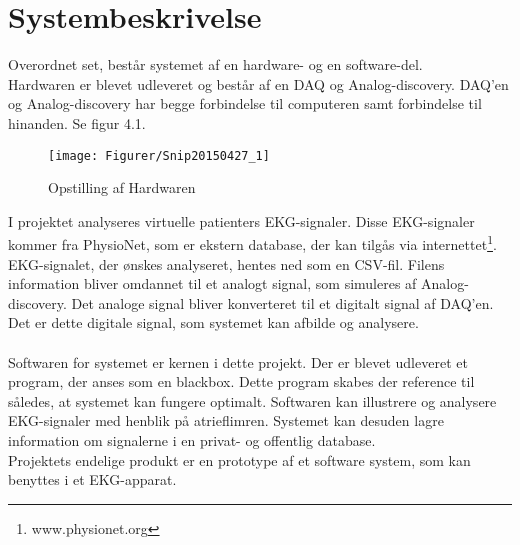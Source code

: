\chapter{Systembeskrivelse}

Overordnet set, består systemet af en hardware- og en software-del.\\ Hardwaren er blevet udleveret og består af en DAQ og Analog-discovery. DAQ'en og Analog-discovery har begge forbindelse til computeren samt forbindelse til hinanden. Se figur 4.1.  

\begin{figure}[H]
	\centering
	\texttt{[image: Figurer/Snip20150427\_1]}
	\caption{Opstilling af Hardwaren}
\end{figure}

I projektet analyseres virtuelle patienters EKG-signaler. Disse EKG-signaler kommer fra PhysioNet, som er ekstern database, der kan tilgås via internettet\footnote{www.physionet.org}. EKG-signalet, der ønskes analyseret, hentes ned som en CSV-fil. Filens information bliver omdannet til et analogt signal, som simuleres af Analog-discovery. Det analoge signal bliver konverteret til et digitalt signal af DAQ'en. Det er dette digitale signal, som systemet kan afbilde og analysere.
\\ \\
Softwaren for systemet er kernen i dette projekt. Der er blevet udleveret et program, der anses som en blackbox. Dette program skabes der reference til således, at systemet kan fungere optimalt. Softwaren kan illustrere og analysere EKG-signaler med henblik på atrieflimren. Systemet kan desuden lagre information om signalerne i en privat- og offentlig database.\\
Projektets endelige produkt er en prototype af et software system, som kan benyttes i et EKG-apparat.            

